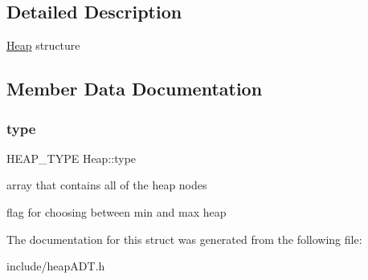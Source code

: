 \subsection{Detailed Description}
\hyperlink{structHeap}{Heap} structure 

\subsection{Member Data Documentation}
\mbox{\label{structHeap_a687e85d124c882bb01f5c9bf91171129}} 
\subsubsection{\texorpdfstring{type}{type}}
{\footnotesize\ttfamily H\+E\+A\+P\+\_\+\+T\+Y\+PE Heap\+::type}



array that contains all of the heap nodes 

flag for choosing between min and max heap 

The documentation for this struct was generated from the following file\+:\begin{DoxyCompactItemize}
\item 
include/heap\+A\+D\+T.\+h\end{DoxyCompactItemize}
